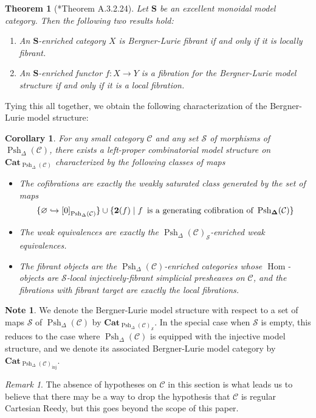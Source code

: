 \documentclass[a4paper]{article}
\numberwithin{equation}{subsection}
\theoremstyle{plain}   %
\newtheorem{thm}[equation]{Theorem}
\newtheorem{cor}[equation]{Corollary}
\theoremstyle{definition}
\newtheorem{note}[equation]{Note}
\theoremstyle{remark}
\newtheorem{rem}[equation]{Remark}
\theoremstyle{plain}
\newcommand{\Cat}{\ensuremath{\mathbf{Cat}}}
\DeclareMathOperator{\Hom}{Hom}
\providecommand{\C}{}
\renewcommand{\C}{\ensuremath{\mathcal{C}}}
\newcommand{\setS}{\ensuremath{\mathscr{S}}}
\newcommand{\spsh}{\ensuremath{\operatorname{Psh}_\Delta(\mathcal{C})}}
\begin{document}
\begin{thm}[\cite{htt}*{Theorem A.3.2.24}]
	Let \(\mathbf{S}\) be an excellent monoidal model category.  Then the following two results hold:
	\begin{enumerate}
		\item An \(\mathbf{S}\)-enriched category \(X\) is Bergner-Lurie fibrant if and only if it is locally fibrant.
		\item An \(\mathbf{S}\)-enriched functor \(f:X\to Y\) is a fibration for the Bergner-Lurie model structure if and only if it is a local fibration.
	\end{enumerate}
\end{thm}
Tying this all together, we obtain the following characterization of the Bergner-Lurie model structure:
\begin{cor}
	For any small category \(\C\) and any set \(\setS\) of morphisms of \(\spsh\), there exists a left-proper combinatorial model structure on \(\Cat_{\spsh}\) characterized by the following classes of maps
	\begin{itemize}
		\item[(C)] 	The cofibrations are exactly the weakly saturated class generated by the set of maps
					\[
						\{\varnothing \hookrightarrow {[0]}_{\spsh}\}\cup \{\mathbf{2}(f)\mid f \enskip \text{is a generating cofibration of} \enskip \mathbf{\spsh}\} 
					\]
		\item[(W)]  The weak equivalences are exactly the \(\spsh_\setS\)-enriched weak equivalences.
		\item[(F)]  The fibrant objects are the \(\spsh\)-enriched categories whose \(\Hom\)-objects are \(\setS\)-local injectively-fibrant simplicial presheaves on \(\C\), and the fibrations with fibrant target are exactly the local fibrations. 
	\end{itemize}
\end{cor}
\begin{note}
	We denote the Bergner-Lurie model structure with respect to a set of maps \(\setS\) of \(\spsh\) by \(\Cat_{\spsh_{\setS}}\).  In the special case when \(\setS\) is empty, this reduces to the case where \(\spsh\) is equipped with the injective model structure, and we denote its associated Bergner-Lurie model category by \(\Cat_{\spsh_{\mathrm{inj}}}\).
\end{note}
\begin{rem}
	The absence of hypotheses on \(\C\) in this section is what leads us to believe that there may be a way to drop the hypothesis that \(\C\) is regular Cartesian Reedy, but this goes beyond the scope of this paper.
\end{rem}
\end{document}
